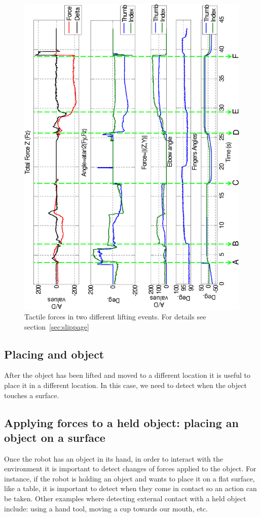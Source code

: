 \begin{figure}[htbp]
\centerline{
\includegraphics[height=\textwidth, angle=270 ]{./figures/ThesisSlipX.eps}
} \caption[Tactile forces when lifting an object]{Tactile forces
in two different lifting events. For details see
section~\ref{sec:slippage} } \label{fig:slip}
\end{figure}

\subsection{Placing and object}
After the object has been lifted and moved to a different location
it is useful to place it in a different location. In this case, we
need to detect when the object touches a surface.

\subsection{Applying forces to a held object: placing an object on a surface}

Once the robot has an object in its hand, in order to interact
with the environment it is important to detect changes of forces
applied to the object. For instance, if the robot is holding an
object and wants to place it on a flat surface, like a table, it
is important to detect when they come in contact so an action can
be taken. Other examples where detecting external contact with a
held object include: using a hand tool, moving a cup towards our
mouth, etc.

